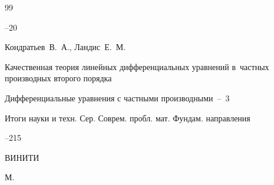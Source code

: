 \begin{thebibliography}{99}


--20





















\by Кондратьев~В.~А., Ландис~Е.~М.

\paper Качественная теория линейных дифференциальных уравнений в~частных производных второго порядка

\inbook Дифференциальные уравнения с частными производными~--~3

\serial Итоги науки и техн. Сер. Соврем. пробл. мат. Фундам. направления



--215

\publ ВИНИТИ

\publaddr М.




\end{thebibliography}
